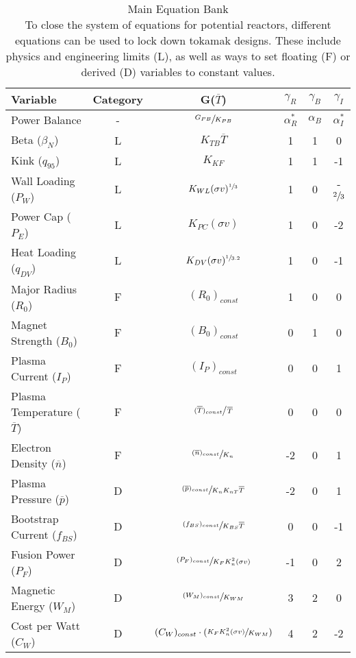 \begin{table}[hb]
\caption[Main Equation Bank]{Main Equation Bank \\ \small To close the system of equations for potential reactors, different equations can be used to lock down tokamak designs. These include physics and engineering limits (L), as well as ways to set floating (F) or derived (D) variables to constant values.}
\begin{spacing}{1.5}
\begin{tabular}{lccccc}
 Variable & Category & G($\overline T$)  & $\gamma_R$ & $\gamma_B$ & $\gamma_{I}$ \\ \hline
Power Balance & - & $\sfrac{ G_{PB} }{ K_{PB} }$ & $\alpha_R^*$ & $\alpha_B$ & $\alpha_I^*$ \\
Beta ($\beta_N$) & L & $K_{TB} \overline T$ & 1 & 1 & 0 \\
Kink ($q_{95}$) & L & $K_{KF} $ & 1 & 1 & -1 \\
Wall Loading ($P_W$) & L & $K_{WL} ( \sigma v )^{\sfrac{1}{3}} $ & 1 & 0 & -$\sfrac{2}{3}$ \\
Power Cap ($P_E$) & L & $K_{PC} ( \sigma v ) $ & 1 & 0 & -2 \\
Heat Loading ($q_{DV}$) & L & $K_{DV} ( \sigma v )^{\sfrac{1}{3.2}} $ & 1 & 0 & -1 \\
Major Radius ($R_0$) & F & $(R_0)_{const}$ & 1 & 0 & 0 \\
Magnet Strength ($B_0$) & F & $(B_0)_{const}$ & 0 & 1 & 0 \\
Plasma Current ($I_P$) & F & $(I_P)_{const}$ & 0 & 0 & 1 \\
Plasma Temperature ($\overline T$) & F & $\sfrac{ (\overline T)_{const} }{ \, \overline T }$ & 0 & 0 & 0 \\
Electron Density ($\overline n$) & F & $\sfrac{ (\overline n)_{const} }{ K_n }$ & -2 & 0 & 1 \\
Plasma Pressure ($\overline p$) & D & $\sfrac{ (\overline p)_{const} }{ K_n K_{nT} \overline T }$ & -2 & 0 & 1 
\\
Bootstrap Current ($f_{BS}$) & D & $\sfrac{ ( f_{BS} )_{const} }{ K_{BS} \overline T }$ & 0 & 0 & -1 \\
Fusion Power ($P_F$) & D & $\sfrac{ (P_F)_{const} }{ K_F K_n ^ 2 ( \sigma v ) }$ & -1 & 0 & 2 \\
Magnetic Energy ($W_M$) & D & $\sfrac{ (W_M)_{const} }{ K_{WM} }$ & 3 & 2 & 0 \\
Cost per Watt ($C_W$) & D & $ (C_W)_{const} \cdot \left( \sfrac{ K_F K_n ^ 2 ( \sigma v ) }{ K_{WM} } \right)$ & 4 & 2 & -2 \\
\end{tabular}
\end{spacing}
\label{table:eq}
\end{table}


